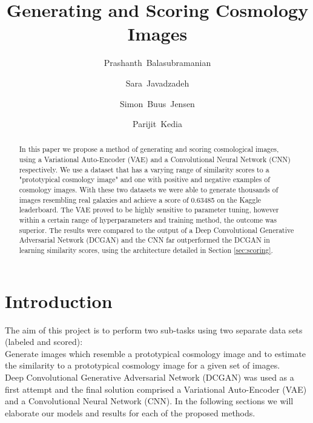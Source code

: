 \documentclass[journal]{IEEEtran}
\begin{document}
\title{Generating and Scoring Cosmology Images}
\author[1]{Prashanth~Balasubramanian}
\author[2]{Sara~Javadzadeh}
\author[3]{Simon~Buus~Jensen}
\author[4]{Parijit~Kedia }
\maketitle

\begin{abstract}
In this paper we propose a method of generating and scoring cosmological images, using a Variational Auto-Encoder (VAE) and a Convolutional Neural Network (CNN) respectively. We use a dataset that has a varying range of similarity scores to a "prototypical cosmology image" and one with positive and negative examples of cosmology images. With these two datasets we were able to generate thousands of images resembling real galaxies and achieve a score of 0.63485 on the Kaggle leaderboard. The VAE proved to be highly sensitive to parameter tuning, however within a certain range of hyperparameters and training method, the outcome was superior. The results were compared to the output of a Deep Convolutional Generative Adversarial Network \cite{DCGAN} (DCGAN) and the CNN far outperformed the DCGAN in learning similarity scores, using the architecture detailed in Section \ref{sec:scoring}.
\end{abstract}

\section{Introduction}
The aim of this project is to perform two sub-tasks using two separate data sets (labeled and scored):\\
Generate images which resemble a prototypical cosmology image and to estimate the similarity to a prototypical cosmology image for a given set of images.\\
Deep Convolutional Generative Adversarial Network (DCGAN) \cite{DCGAN} was used as a first attempt and the final solution comprised a Variational Auto-Encoder (VAE) and a Convolutional Neural Network (CNN). In the following sections we will elaborate our models and results for each of the proposed methods.
\end{document}
